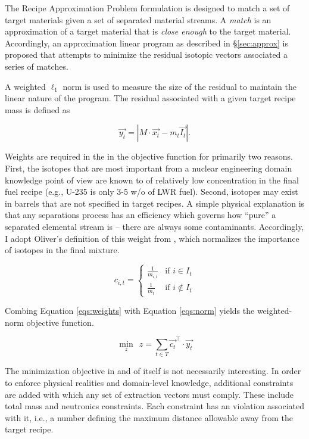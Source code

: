 The Recipe Approximation Problem formulation is designed to match a set of
target materials given a set of separated material streams. A \textit{match} is
an approximation of a target material that is \textit{close enough} to the
target material. Accordingly, an approximation linear program as described
in \S\ref{sec:approx} is proposed that attempts to minimize the residual
isotopic vectors associated a series of matches. 

A weighted $\ell_1$ norm is used to measure the size of the residual to maintain the
linear nature of the program. The residual associated with a given target recipe
mass is defined as

\begin{equation}\label{eqs:norm}
\vec{y_{t}} = \left| M \cdot \vec{x_{t}}  - m_t \vec{I_{t}} \right|.
\end{equation}

Weights are required in the in the objective function for primarily two
reasons. First, the isotopes that are most important from a nuclear engineering
domain knowledge point of view are known to of relatively low concentration in
the final fuel recipe (e.g., U-235 is only 3-5 w/o of LWR fuel). Second,
isotopes may exist in barrels that are not specified in target recipes. A simple
physical explanation is that any separations process has an efficiency which
governs how ``pure'' a separated elemental stream is -- there are always some
contaminants. Accordingly, I adopt Oliver's definition of this weight
from \cite{oliver_geniusv2:_2009}, which normalizes the importance of isotopes
in the final mixture.

\begin{equation}\label{eqs:weights}
c_{i,t} = 
\begin{cases}
 \frac{1}{m_{i,t}} & \text{if } i \in I_{t} \\
 \frac{1}{m_{t}}   & \text{if } i \not\in I_{t}
\end{cases}
\end{equation}

Combing Equation \ref{eqs:weights} with Equation \ref{eqs:norm} yields the
weighted-norm objective function.

\begin{equation}
\min_{z} \:\: z = \sum_{t \in T} \vec{c_{t}}^{\top} \cdot \vec{y_{t}}
\end{equation}

The minimization objective in and of itself is not necessarily interesting. In
order to enforce physical realities and domain-level knowledge, additional
constraints are added with which any set of extraction vectors must
comply. These include total mass and neutronics constraints. Each constraint has
an violation associated with it, i.e., a number defining the maximum distance
allowable away from the target recipe.

